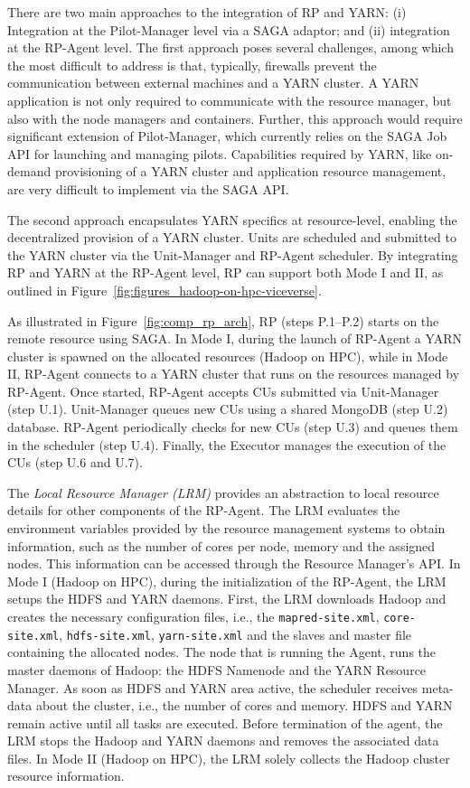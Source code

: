 There are two main approaches to the integration of RP and YARN: (i)
Integration at the Pilot-Manager level via a SAGA adaptor; and (ii) integration
at the RP-Agent level. The first approach poses several challenges,
among which the most difficult to address is that, typically, firewalls prevent
the communication between external machines and a YARN cluster. A YARN
application is not only required to communicate with the resource manager, but
also with the node managers and containers. Further, this approach would require
significant extension of Pilot-Manager, which currently relies on the SAGA Job
API for launching and managing pilots. Capabilities required by YARN, like
on-demand provisioning of a YARN cluster and application resource management,
are very difficult to implement via the SAGA API.

The second approach encapsulates YARN specifics at resource-level, enabling the
decentralized provision of a YARN cluster. Units are scheduled and submitted to
the YARN cluster via the Unit-Manager and RP-Agent scheduler. By
integrating RP and YARN at the RP-Agent level, RP can support both Mode I
and II, as outlined in Figure~\ref{fig:figures_hadoop-on-hpc-viceverse}.

As illustrated in Figure~\ref{fig:comp_rp_arch}, RP (steps P.1--P.2)
starts on the remote resource using SAGA. In Mode I, during the launch of
RP-Agent a YARN cluster is spawned on the allocated resources (Hadoop
on HPC), while in Mode II, RP-Agent connects to a YARN cluster that
runs on the resources managed by RP-Agent. Once started, RP-Agent
 accepts CUs submitted via Unit-Manager (step U.1).
Unit-Manager queues new CUs using a shared MongoDB (step U.2)
database. RP-Agent periodically checks for new CUs (step
U.3) and queues them in the scheduler (step U.4). Finally, the Executor manages
the execution of the CUs (step U.6 and U.7).

The \emph{Local Resource Manager (LRM)} provides an abstraction to local
resource details for other components of the RP-Agent. The LRM
evaluates the environment variables provided by the resource management systems
to obtain information, such as the number of cores per node, memory and the
assigned nodes. This information can be accessed through the Resource Manager's
API. In Mode I (Hadoop on HPC), during the initialization of the
RP-Agent, the LRM setups the HDFS and YARN daemons. First, the LRM
downloads Hadoop and creates the necessary configuration files, i.e., the
\texttt{mapred-site.xml}, \texttt{core-site.xml}, \texttt{hdfs-site.xml},
\texttt{yarn-site.xml} and the slaves and master file containing the allocated
nodes. The node that is running the Agent, runs the master daemons of Hadoop:
the HDFS Namenode and the YARN Resource Manager.
As soon as HDFS and YARN area active, the scheduler receives meta-data about
the cluster, i.e., the number of cores and memory. HDFS and YARN remain
active until all tasks are executed. Before termination of the agent, the
LRM stops the Hadoop and YARN daemons and removes the associated data files. In
Mode II (Hadoop on HPC), the LRM solely collects the Hadoop cluster resource
information.

